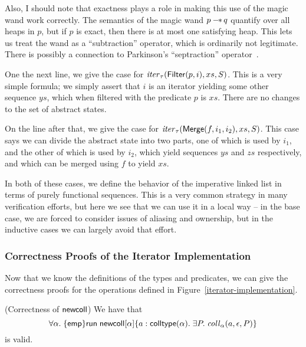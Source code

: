 Also, I should note that exactness plays a role in making this use of
the magic wand work correctly. The semantics of the magic wand $p
-\!\!*\, q$ quantify over all heaps in $p$, but if $p$ is exact, then
there is at most one satisfying heap. This lets us treat the wand as a
``subtraction'' operator, which is ordinarily not legitimate. There is
possibly a connection to Parkinson's ``septraction''
operator~\cite{parkinson-septraction}. 

One the next line, we give the case for $\mathit{iter}_\tau(\mathsf{Filter}(p, i),
xs, S)$.  This is a very simple formula; we simply assert that $i$ is
an iterator yielding some other sequence $ys$, which when filtered with
the predicate $p$ is $xs$. There are no changes to the set of abstract
states. 

On the line after that, we give the case for $\mathit{iter}_\tau(\mathsf{Merge}(f, i_1, i_2), xs, S)$. 
This case says we can divide the abstract state into two parts, one of which is 
used by $i_1$, and the other of which is used by $i_2$,  which 
yield sequences $ys$ and $zs$ respectively, and which can be merged using
$f$ to yield $xs$. 

In both of these cases, we define the behavior of the imperative
linked list in terms of purely functional sequences. This is a very
common strategy in many verification efforts, but here we see that we
can use it in a local way -- in the base case, we are forced to
consider issues of aliasing and ownership, but in the inductive cases
we can largely avoid that effort.


\subsubsection{Correctness Proofs of the Iterator Implementation}

Now that we know the definitions of the types and predicates, we can
give the correctness proofs for the operations defined in
Figure~\ref{iterator-implementation}. 

\begin{lemma}{(Correctness of $\mathsf{newcoll}$)}
  We have that 
  \begin{displaymath}
    \forall \alpha.\; \{{\mathsf{emp}}\}{\mathsf{run}\;{\mathsf{newcoll}[\alpha]}}\{{a:\mathsf{colltype}(\alpha)}.\;{\exists P.\; \mathit{coll}_\alpha(a, \epsilon,P)}\}
  \end{displaymath}
  is valid. 
\end{lemma}

